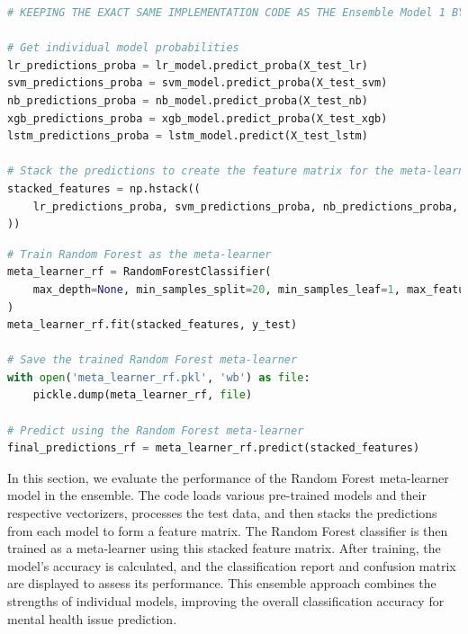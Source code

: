 \begin{tcolorbox}[colback=gray!5!white, colframe=gray!80!black, boxrule=0.5pt, title=Evaluate Meta-Learner and Ensemble Model 3]
    \begin{lstlisting}[language=Python]
# KEEPING THE EXACT SAME IMPLEMENTATION CODE AS THE Ensemble Model 1 BY IMPORTING THE NECESSARY LIBRARIES, LOADING THE MODELS, AND PREPROCESSING THE DATA 

# Get individual model probabilities
lr_predictions_proba = lr_model.predict_proba(X_test_lr)
svm_predictions_proba = svm_model.predict_proba(X_test_svm)
nb_predictions_proba = nb_model.predict_proba(X_test_nb)
xgb_predictions_proba = xgb_model.predict_proba(X_test_xgb)
lstm_predictions_proba = lstm_model.predict(X_test_lstm)

# Stack the predictions to create the feature matrix for the meta-learner
stacked_features = np.hstack((
    lr_predictions_proba, svm_predictions_proba, nb_predictions_proba, xgb_predictions_proba, lstm_predictions_proba
))
\end{lstlisting}
\end{tcolorbox}
\begin{tcolorbox}[colback=gray!5!white, colframe=gray!80!black, boxrule=0.5pt, title=Evaluate Meta-Learner and Ensemble Model 3]
    \begin{lstlisting}[language=Python]
# Train Random Forest as the meta-learner
meta_learner_rf = RandomForestClassifier(
    max_depth=None, min_samples_split=20, min_samples_leaf=1, max_features='sqrt', bootstrap=False, random_state=42           
)
meta_learner_rf.fit(stacked_features, y_test)

# Save the trained Random Forest meta-learner
with open('meta_learner_rf.pkl', 'wb') as file:
    pickle.dump(meta_learner_rf, file)

# Predict using the Random Forest meta-learner
final_predictions_rf = meta_learner_rf.predict(stacked_features)
    \end{lstlisting}
\end{tcolorbox}

\noindent
In this section, we evaluate the performance of the Random Forest meta-learner model in the ensemble. The code loads various pre-trained models and their respective vectorizers, processes the test data, and then stacks the predictions from each model to form a feature matrix. The Random Forest classifier is then trained as a meta-learner using this stacked feature matrix. After training, the model's accuracy is calculated, and the classification report and confusion matrix are displayed to assess its performance. This ensemble approach combines the strengths of individual models, improving the overall classification accuracy for mental health issue prediction.


